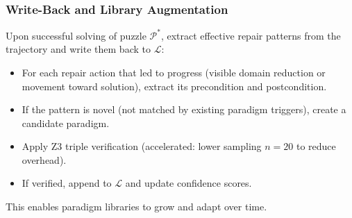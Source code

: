 \subsubsection{Write-Back and Library Augmentation}

Upon successful solving of puzzle $\mathcal{P}^*$, extract effective repair patterns from the trajectory and write them back to $\mathcal{L}$:
\begin{itemize}
    \item For each repair action that led to progress (visible domain reduction or movement toward solution), extract its precondition and postcondition.
    \item If the pattern is novel (not matched by existing paradigm triggers), create a candidate paradigm.
    \item Apply Z3 triple verification (accelerated: lower sampling $n = 20$ to reduce overhead).
    \item If verified, append to $\mathcal{L}$ and update confidence scores.
\end{itemize}

This enables paradigm libraries to grow and adapt over time.
